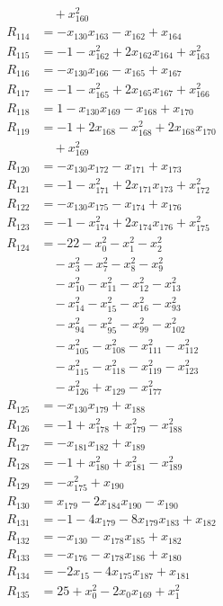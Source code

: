 \begin{align*}
&\quad{}+x_{160}^{2}\\
R_{114}&=-x_{130}x_{163}-x_{162}+x_{164}\\
R_{115}&=-1-x_{162}^{2}+2x_{162}x_{164}+x_{163}^{2}\\
R_{116}&=-x_{130}x_{166}-x_{165}+x_{167}\\
R_{117}&=-1-x_{165}^{2}+2x_{165}x_{167}+x_{166}^{2}\\
R_{118}&=1-x_{130}x_{169}-x_{168}+x_{170}\\
R_{119}&=-1+2x_{168}-x_{168}^{2}+2x_{168}x_{170}\\
&\quad{}+x_{169}^{2}\\
R_{120}&=-x_{130}x_{172}-x_{171}+x_{173}\\
R_{121}&=-1-x_{171}^{2}+2x_{171}x_{173}+x_{172}^{2}\\
R_{122}&=-x_{130}x_{175}-x_{174}+x_{176}\\
R_{123}&=-1-x_{174}^{2}+2x_{174}x_{176}+x_{175}^{2}\\
R_{124}&=-22-x_{0}^{2}-x_{1}^{2}-x_{2}^{2}\\
&\quad{}-x_{3}^{2}-x_{7}^{2}-x_{8}^{2}-x_{9}^{2}\\
&\quad{}-x_{10}^{2}-x_{11}^{2}-x_{12}^{2}-x_{13}^{2}\\
&\quad{}-x_{14}^{2}-x_{15}^{2}-x_{16}^{2}-x_{93}^{2}\\
&\quad{}-x_{94}^{2}-x_{95}^{2}-x_{99}^{2}-x_{102}^{2}\\
&\quad{}-x_{105}^{2}-x_{108}^{2}-x_{111}^{2}-x_{112}^{2}\\
&\quad{}-x_{115}^{2}-x_{118}^{2}-x_{119}^{2}-x_{123}^{2}\\
&\quad{}-x_{126}^{2}+x_{129}-x_{177}^{2}\\
R_{125}&=-x_{130}x_{179}+x_{188}\\
R_{126}&=-1+x_{178}^{2}+x_{179}^{2}-x_{188}^{2}\\
R_{127}&=-x_{181}x_{182}+x_{189}\\
R_{128}&=-1+x_{180}^{2}+x_{181}^{2}-x_{189}^{2}\\
R_{129}&=-x_{175}^{2}+x_{190}\\
R_{130}&=x_{179}-2x_{184}x_{190}-x_{190}\\
R_{131}&=-1-4x_{179}-8x_{179}x_{183}+x_{182}\\
R_{132}&=-x_{130}-x_{178}x_{185}+x_{182}\\
R_{133}&=-x_{176}-x_{178}x_{186}+x_{180}\\
R_{134}&=-2x_{15}-4x_{175}x_{187}+x_{181}\\
R_{135}&=25+x_{0}^{2}-2x_{0}x_{169}+x_{1}^{2}\\

\end{align*}
